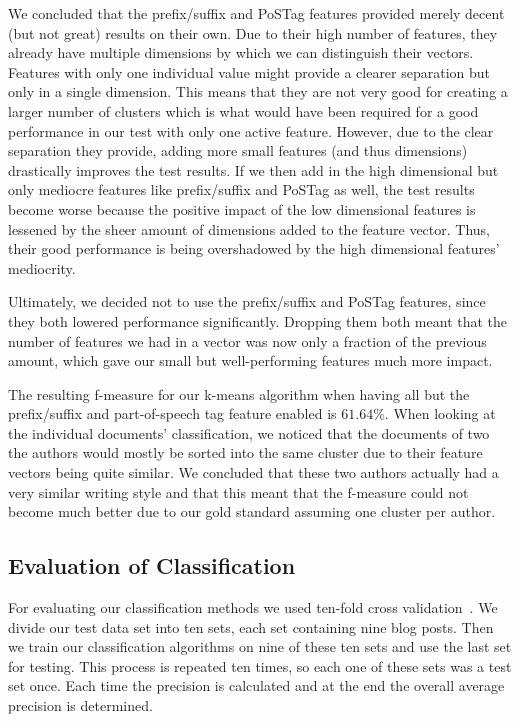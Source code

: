 We concluded that the prefix/suffix and PoSTag features provided merely decent (but not great) results on their own.
Due to their high number of features, they already have multiple dimensions by which we can distinguish their vectors.
Features with only one individual value might provide a clearer separation but only in a single dimension.
This means that they are not very good for creating a larger number of clusters which is what would have been required for a good performance in our test with only one active feature.
However, due to the clear separation they provide, adding more small features (and thus dimensions) drastically improves the test results.
If we then add in the high dimensional but only mediocre features like prefix/suffix and PoSTag as well, the test results become worse because the positive impact of the low dimensional features is lessened by the sheer amount of dimensions added to the feature vector.
Thus, their good performance is being overshadowed by the high dimensional features' mediocrity.


Ultimately, we decided not to use the prefix/suffix and PoSTag features, since they both lowered performance significantly.
Dropping them both meant that the number of features we had in a vector was now only a fraction of the previous amount, which gave our small but well-performing features much more impact.


The resulting f-measure for our k-means algorithm when having all but the prefix/suffix and part-of-speech tag feature enabled is $61.64\%$.
When looking at the individual documents' classification, we noticed that the documents of two the authors would mostly be sorted into the same cluster due to their feature vectors being quite similar.
We concluded that these two authors actually had a very similar writing style and that this meant that the f-measure could not become much better due to our gold standard assuming one cluster per author.


\subsection{Evaluation of Classification}
\label{sec:evaluation_classification}

For evaluating our classification methods we used ten-fold cross validation~\cite{kohavi1995study}.
We divide our test data set into ten sets, each set containing nine blog posts.
Then we train our classification algorithms on nine of these ten sets and use the last set for testing.
This process is repeated ten times, so each one of these sets was a test set once.
Each time the precision is calculated and at the end the overall average precision is determined.


